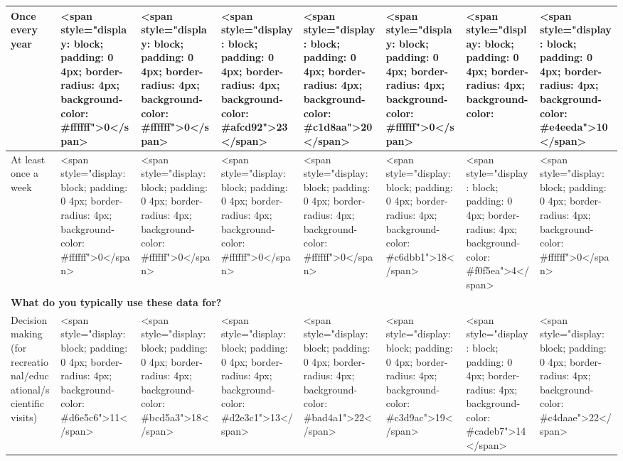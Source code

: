 \documentclass[
]{article}
\begin{document}
\begin{table}
\begin{tabular}[t]{l|l|l|l|l|l|l|l}
\hspace{1em}Once every year & <span style="display: block; padding: 0 4px; border-radius: 4px; background-color: #ffffff">0</span> & <span style="display: block; padding: 0 4px; border-radius: 4px; background-color: #ffffff">0</span> & <span style="display: block; padding: 0 4px; border-radius: 4px; background-color: #afcd92">23</span> & <span style="display: block; padding: 0 4px; border-radius: 4px; background-color: #c1d8aa">20</span> & <span style="display: block; padding: 0 4px; border-radius: 4px; background-color: #ffffff">0</span> & <span style="display: block; padding: 0 4px; border-radius: 4px; background-color: #9ac075">27</span> & <span style="display: block; padding: 0 4px; border-radius: 4px; background-color: #e4eeda">10</span>\\
\hline
\hspace{1em}At least once a week & <span style="display: block; padding: 0 4px; border-radius: 4px; background-color: #ffffff">0</span> & <span style="display: block; padding: 0 4px; border-radius: 4px; background-color: #ffffff">0</span> & <span style="display: block; padding: 0 4px; border-radius: 4px; background-color: #ffffff">0</span> & <span style="display: block; padding: 0 4px; border-radius: 4px; background-color: #ffffff">0</span> & <span style="display: block; padding: 0 4px; border-radius: 4px; background-color: #c6dbb1">18</span> & <span style="display: block; padding: 0 4px; border-radius: 4px; background-color: #f0f5ea">4</span> & <span style="display: block; padding: 0 4px; border-radius: 4px; background-color: #ffffff">0</span>\\
\hline
\multicolumn{8}{l}{\textbf{What do you typically use these data for?}}\\
\hline
\hspace{1em}Decision making (for recreational/educational/scientific visits) & <span style="display: block; padding: 0 4px; border-radius: 4px; background-color: #d6e5c6">11</span> & <span style="display: block; padding: 0 4px; border-radius: 4px; background-color: #bcd5a3">18</span> & <span style="display: block; padding: 0 4px; border-radius: 4px; background-color: #d2e3c1">13</span> & <span style="display: block; padding: 0 4px; border-radius: 4px; background-color: #bad4a1">22</span> & <span style="display: block; padding: 0 4px; border-radius: 4px; background-color: #c3d9ac">19</span> & <span style="display: block; padding: 0 4px; border-radius: 4px; background-color: #cadeb7">14</span> & <span style="display: block; padding: 0 4px; border-radius: 4px; background-color: #c4daae">22</span>\\

\end{tabular}
\end{table}
\end{document}
